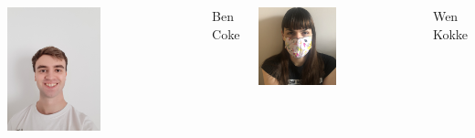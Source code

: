 \documentclass[t,compress,aspectratio=169]{beamer}
\begin{document}
\begin{frame}
\begin{columns}
       \centering
\vspace{-5em}
         \includegraphics[width=0.5\textwidth]{img/Ben.jpg}
           \vspace{4em}
   \begin{block}{\centering\footnotesize{Ben Coke}}
       \end{block}
    
    \includegraphics[width=0.5\textwidth]{img/Wen.png}
      \begin{alertblock}{\centering \footnotesize{Wen Kokke}}
   \end{alertblock}


\end{columns}
\end{frame}
\end{document}
